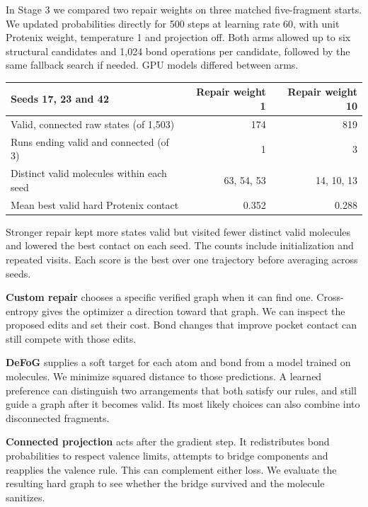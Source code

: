 \documentclass[11pt,a4paper]{article}
\newcommand{\subhead}[1]{\par\vspace{4pt}{\sffamily\bfseries\fontsize{12}{14}\selectfont #1\par}\vspace{-2pt}}
\begin{document}
In Stage 3 we compared two repair weights on three matched five-fragment starts. We updated probabilities directly for 500 steps at learning rate 60, with unit Protenix weight, temperature 1 and projection off. Both arms allowed up to six structural candidates and 1,024 bond operations per candidate, followed by the same fallback search if needed. GPU models differed between arms.

\begin{center}\small\sffamily
\begin{tabular*}{.94\linewidth}{@{\extracolsep{\fill}}lrr@{}}
\toprule
Seeds 17, 23 and 42 & Repair weight 1 & Repair weight 10\\
\midrule
Valid, connected raw states (of 1,503) & 174 & 819\\
Runs ending valid and connected (of 3) & 1 & 3\\
Distinct valid molecules within each seed & 63, 54, 53 & 14, 10, 13\\
Mean best valid hard Protenix contact & 0.352 & 0.288\\
\bottomrule
\end{tabular*}\end{center}
Stronger repair kept more states valid but visited fewer distinct valid molecules and lowered the best contact on each seed. The counts include initialization and repeated visits. Each score is the best over one trajectory before averaging across seeds.

\subhead{Three ways to guide the same relaxed graph}
\textbf{Custom repair} chooses a specific verified graph when it can find one. Cross-entropy gives the optimizer a direction toward that graph. We can inspect the proposed edits and set their cost. Bond changes that improve pocket contact can still compete with those edits.

\textbf{DeFoG} supplies a soft target for each atom and bond from a model trained on molecules. We minimize squared distance to those predictions. A learned preference can distinguish two arrangements that both satisfy our rules, and still guide a graph after it becomes valid. Its most likely choices can also combine into disconnected fragments.

\textbf{Connected projection} acts after the gradient step. It redistributes bond probabilities to respect valence limits, attempts to bridge components and reapplies the valence rule. This can complement either loss. We evaluate the resulting hard graph to see whether the bridge survived and the molecule sanitizes.
\end{document}
